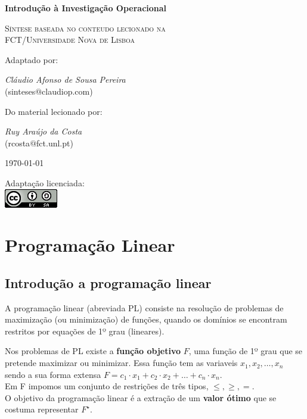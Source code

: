 \documentclass[]{report}
\begin{document}
\begin{titlepage}
	\centering
	\vspace{5cm}
	{\huge\bfseries Introdução à Investigação Operacional\par}
	\vspace{1cm}
	{\scshape\Large Síntese baseada no conteudo lecionado na\\
	 FCT/Universidade Nova de Lisboa\par}
	\vspace{2cm}
	Adaptado por:\\
	{\Large \textit{Cláudio Afonso de Sousa Pereira}\\
	(sinteses$\text{@}$claudiop$.$com)\par}
	\vspace{1cm}
	Do material lecionado por:\\
	{\Large \textit{Ruy Araújo da Costa}\\
	(rcosta$\text{@}$fct$.$unl$.$pt)\par}
	\vspace{1cm}
	{\large \today\par}
	\vfill
	Adaptação licenciada:\\
	\href{http://creativecommons.org/licenses/by-sa/4.0/}{\includegraphics[scale=0.8]{ccbysa.png}}
\end{titlepage}
\chapter{Programação Linear}
\section{Introdução a programação linear}
A programação linear (abreviada PL) consiste na resolução de problemas de maximização (ou minimização) de funções, quando os domínios se encontram restritos por equações de 1º grau (lineares).\\ \par
Nos problemas de PL existe a \textbf{função objetivo} $F$, uma função de 1º grau que se pretende maximizar ou minimizar. Essa função tem as variaveis $x_1, x_2, \dots, x_n$ sendo a sua forma extensa $F=c_1 \cdot x_1 + c_2 \cdot x_2 + \dots + c_n \cdot x_n$.\\
Em F impomos um conjunto de restrições de três tipos, $\leq, \geq, =$.\\
O objetivo da programação linear é a extração de um \textbf{valor ótimo} que se costuma representar $F^\star$.
\end{document}
